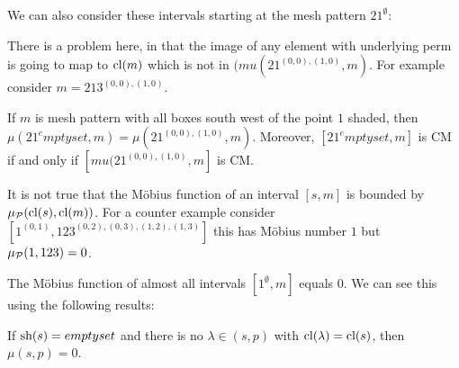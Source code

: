 \documentclass[11pt,a4paper,oneside]{article}
\begin{document}
We can also consider these intervals starting at the mesh pattern $21^\emptyset$:
\begin{lem} There is a problem here, in that the image of any element with underlying perm is going to map to $\operatorname{\textrm{cl}}(m)$ which is not in $(mu(21^{(0,0),(1,0)},m)$. For example consider $m=213^{(0,0),(1,0)}$.

If $m$ is mesh pattern with all boxes south west of the point $1$ shaded, then $\mu(21^emptyset,m)=\mu(21^{(0,0),(1,0)},m)$. Moreover, $[21^emptyset,m]$ is CM if and only if $[mu(21^{(0,0),(1,0)},m]$ is CM.
\end{lem}

It is not true that the M\"obius function of an interval $[s,m]$ is bounded by $\operatorname{\mu_\mathcal{P}}(\operatorname{\textrm{cl}}(s),\operatorname{\textrm{cl}}(m))$. For a counter example consider $[1^{(0,1)},123^{(0,2),(0,3),(1,2),(1,3)}]$ this has M\"obius number $1$ but $\operatorname{\mu_\mathcal{P}}(1,123)=0$.

The M\"obius function of almost all intervals $[1^\emptyset,m]$ equals $0$. We can see this using the following results:
\begin{lem}
If $\operatorname{\textrm{sh}}(s)=emptyset$ and there is no $\lambda\in(s,p)$ with $\operatorname{\textrm{cl}}(\lambda)=\operatorname{\textrm{cl}}(s)$, then $\mu(s,p)=0$.
\end{lem}
\end{document}
